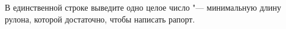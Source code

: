 В единственной строке выведите одно целое число "--- минимальную длину рулона, которой достаточно, чтобы написать рапорт.